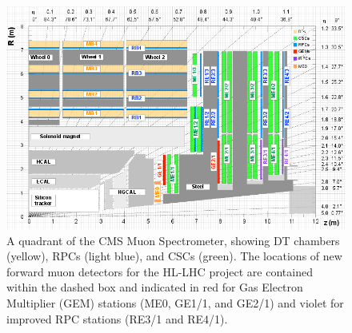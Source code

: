 \begin{figure}
    \includegraphics[width=1\textwidth]{uioposter-images/cms_muon}
    \caption{A quadrant of the CMS Muon Spectrometer, showing DT chambers (yellow), RPCs (light blue), and CSCs (green). The locations of new forward muon detectors for the HL-LHC project are contained within the dashed box and indicated in red for Gas Electron Multiplier (GEM) stations (ME0, GE1/1, and GE2/1) and violet for improved RPC stations (RE3/1 and RE4/1).}
    \label{cms_muon_upgrade}
\end{figure}


